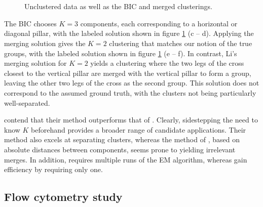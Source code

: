 \documentclass{uwstat572}
\renewcommand\;{\,}
\begin{document}
 \begin{figure}
\begin{center}
\\
\\
\end{center}
\caption{Unclustered data as well as the BIC and merged clusterings.}
\label{Example4_2}
\end{figure}

The BIC chooses $K = 3$ components, each corresponding to a horizontal or diagonal pillar, with the labeled solution shown in figure \ref{Example4_2} (c -- d).
Applying the merging solution gives the $K = 2$ clustering that matches our notion of the true groups, with the labeled solution shown in figure \ref{Example4_2} (e -- f).
In contrast, Li's merging solution for $K = 2$ yields a clustering where the two legs of the cross closest to the vertical pillar are merged with the vertical pillar to form a group, leaving the other two legs of the cross as the second group.
This solution does not correspond to the assumed ground truth, with the clusters not being particularly well-separated.

\cite{Baudry10} contend that their method outperforms that of \cite{Li05}.
Clearly, sidestepping the need to know $K$ beforehand provides a broader range of candidate applications.
Their method also excels at separating clusters, whereas the method of \cite{Li05}, based on absolute distances between components, seems prone to yielding irrelevant merges. 
In addition, \cite{Li05} requires multiple runs of the EM algorithm, whereas \cite{Baudry10} gain efficiency by requiring only one.

\subsection{Flow cytometry study}
\end{document}

